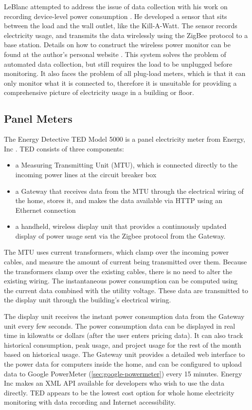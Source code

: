 LeBlanc attempted to address the issue of data collection with his work on recording device-level power consumption \cite{leblanc-2007}. He developed a sensor that sits between the load and the wall outlet, like the Kill-A-Watt. The sensor records electricity usage, and transmits the data wirelessly using the ZigBee protocol to a base station. Details on how to construct the wireless power monitor can be found at the author's personal website \cite{LeBlanc2008power-mon-howto}. This system solves the problem of automated data collection, but still requires the load to be unplugged before monitoring. It also faces the problem of all plug-load meters, which is that it can only monitor what it is connected to, therefore it is unsuitable for providing a comprehensive picture of electricity usage in a building or floor.

\subsection{Panel Meters}
\label{sec:panel-meters}

The Energy Detective TED Model 5000 is a panel electricity meter from Energy, Inc \cite{the-energy-detective}. TED consists of three components:

\begin{itemize}
	\item a Measuring Transmitting Unit (MTU), which is connected directly to the incoming power lines at the circuit breaker box
	\item a Gateway that receives data from the MTU through the electrical wiring of the home, stores it, and makes the data available via HTTP using an Ethernet connection
	\item a handheld, wireless display unit that provides a continuously updated display of power usage sent via the Zigbee protocol from the Gateway.
\end{itemize}

The MTU uses current transformers, which clamp over the incoming power cables, and measure the amount of current being transmitted over them. Because the transformers clamp over the existing cables, there is no need to alter the existing wiring. The instantaneous power consumption can be computed using the current data combined with the utility voltage. These data are transmitted to the display unit through the building's electrical wiring.

The display unit receives the instant power consumption data from the Gateway unit every few seconds. The power consumption data can be displayed in real time in kilowatts or dollars (after the user enters pricing data). It can also track historical consumption, peak usage, and project usage for the rest of the month based on historical usage. The Gateway unit provides a detailed web interface to the power data for computers inside the home, and can be configured to upload data to Google PowerMeter (\autoref{sec:google-powermeter}) every 15 minutes. Energy Inc makes an XML API available for developers who wish to use the data directly. TED appears to be the lowest cost option for whole home electricity monitoring with data recording and Internet accessibility.

